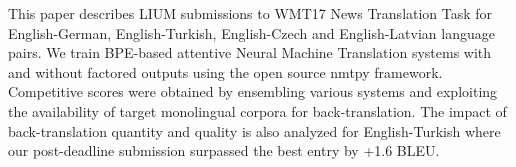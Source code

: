 This paper describes LIUM submissions to WMT17 News Translation Task for English-German, English-Turkish, English-Czech and English-Latvian language pairs. We train BPE-based attentive Neural Machine Translation systems with and without factored outputs using the open source nmtpy framework. Competitive scores were obtained by ensembling various systems and exploiting the availability of target monolingual corpora for back-translation. The impact of back-translation quantity and quality is also analyzed for English-Turkish where our post-deadline submission surpassed the best entry by +1.6 BLEU.
